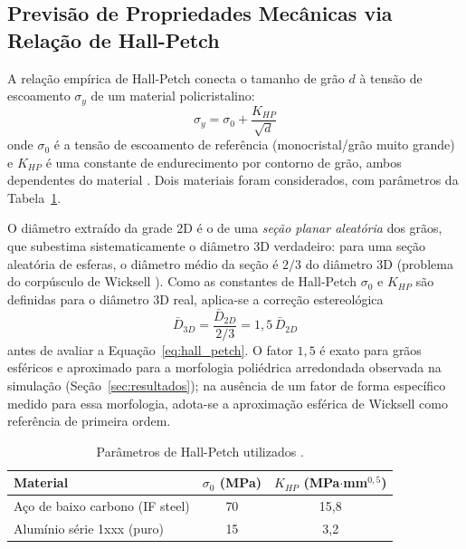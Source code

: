 \documentclass[12pt,a4paper]{article}
\begin{document}
\subsection{Previsão de Propriedades Mecânicas via Relação de Hall-Petch}

A relação empírica de Hall-Petch \cite{hall1951, petch1953} conecta o tamanho de
grão $d$ à tensão de escoamento $\sigma_y$ de um material policristalino:
\begin{equation}
    \sigma_y = \sigma_0 + \frac{K_{HP}}{\sqrt{d}}
    \label{eq:hall_petch}
\end{equation}
onde $\sigma_0$ é a tensão de escoamento de referência (monocristal/grão muito
grande) e $K_{HP}$ é uma constante de endurecimento por contorno de grão, ambos
dependentes do material \cite{gladman1997}. Dois materiais foram considerados, com
parâmetros da Tabela~\ref{tab:hallpetch_params}.

O diâmetro extraído da grade 2D é o de uma \emph{seção planar aleatória} dos grãos,
que subestima sistematicamente o diâmetro 3D verdadeiro: para uma seção aleatória de
esferas, o diâmetro médio da seção é $2/3$ do diâmetro 3D (problema do corpúsculo de
Wicksell \cite{wicksell1925}). Como as constantes de Hall-Petch $\sigma_0$ e
$K_{HP}$ são definidas para o diâmetro 3D real, aplica-se a correção estereológica
\begin{equation}
    \bar{D}_{3D} = \frac{\bar{D}_{2D}}{2/3} = 1{,}5\,\bar{D}_{2D}
    \label{eq:wicksell}
\end{equation}
antes de avaliar a Equação~\ref{eq:hall_petch}. O fator $1{,}5$ é exato para grãos
esféricos e aproximado para a morfologia poliédrica arredondada observada na
simulação (Seção~\ref{sec:resultados}); na ausência de um fator de forma específico
medido para essa morfologia, adota-se a aproximação esférica de Wicksell como
referência de primeira ordem.

\begin{table}[H]
\centering
\caption{Parâmetros de Hall-Petch utilizados \cite{gladman1997}.}
\label{tab:hallpetch_params}
\begin{tabular}{lcc}
\toprule
\textbf{Material} & $\sigma_0$ (MPa) & $K_{HP}$ (MPa$\cdot$mm$^{0{,}5}$) \\
\midrule
Aço de baixo carbono (IF steel) & 70 & 15{,}8 \\
Alumínio série 1xxx (puro)      & 15 & 3{,}2  \\
\bottomrule
\end{tabular}
\end{table}
\end{document}
